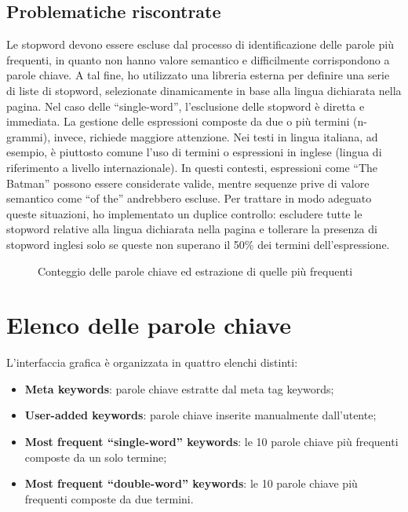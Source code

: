 \subsection{Problematiche riscontrate}

\par Le \gls{stopword} devono essere escluse dal processo di identificazione delle parole più frequenti, in quanto non hanno valore semantico e difficilmente corrispondono a parole chiave. A tal fine, ho utilizzato una libreria esterna per definire una serie di liste di \gls{stopword}, selezionate dinamicamente in base alla lingua dichiarata nella pagina. Nel caso delle “single-word”, l’esclusione delle \gls{stopword} è diretta e immediata. La gestione delle espressioni composte da due o più termini (n-grammi), invece, richiede maggiore attenzione. Nei testi in lingua italiana, ad esempio, è piuttosto comune l’uso di termini o espressioni in inglese (lingua di riferimento a livello internazionale). In questi contesti, espressioni come “The Batman” possono essere considerate valide, mentre sequenze prive di valore semantico come “of the” andrebbero escluse. Per trattare in modo adeguato queste situazioni, ho implementato un duplice controllo: escludere tutte le \gls{stopword} relative alla lingua dichiarata nella pagina e tollerare la presenza di \gls{stopword} inglesi solo se queste non superano il 50\% dei termini dell’espressione.

\begin{figure}[H]
  \centering 
  \caption{Conteggio delle parole chiave ed estrazione di quelle più frequenti}
  \label{fig:word_count}
\end{figure}

\section{Elenco delle parole chiave}
\label{sec:keyword-list}

\par L'interfaccia grafica è organizzata in quattro elenchi distinti: 
\begin{itemize}
  \item \textbf{Meta keywords}: parole chiave estratte dal meta tag keywords;
  \item \textbf{User-added keywords}: parole chiave inserite manualmente dall'utente;
  \item \textbf{Most frequent “single-word” keywords}: le 10 parole chiave più frequenti composte da un solo termine;
  \item \textbf{Most frequent “double-word” keywords}: le 10 parole chiave più frequenti composte da due termini.
\end{itemize}

